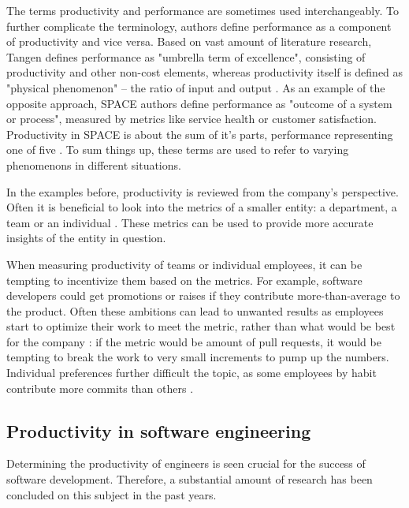 The terms productivity and performance are sometimes used interchangeably. To further complicate the terminology, authors define performance as a component of productivity and vice versa. Based on vast amount of literature research, Tangen defines performance as "umbrella term of excellence", consisting of productivity and other non-cost elements, whereas productivity itself is defined as "physical phenomenon" – the ratio of input and output \cite{tangen_demystifying_2005}. As an example of the opposite approach, SPACE authors define performance as "outcome of a system or process", measured by metrics like service health or customer satisfaction. Productivity in SPACE is about the sum of it's parts, performance representing one of five \cite{forsgren_space_2021}. To sum things up, these terms are used to refer to varying phenomenons in different situations.

In the examples before, productivity is reviewed from the company's perspective. Often it is beneficial to look into the metrics of a smaller entity: a department, a team or an individual \cite{forsgren_space_2021} \cite{tangen_demystifying_2005}. These metrics can be used to provide more accurate insights of the entity in question.

When measuring productivity of teams or individual employees, it can be tempting to incentivize them based on the metrics. For example, software developers could get promotions or raises if they contribute more-than-average to the product. Often these ambitions can lead to unwanted results as employees start to optimize their work to meet the metric, rather than what would be best for the company\cite{symons_software_2010} \cite{chew_no-nonsense_1988}: if the metric would be amount of pull requests, it would be tempting to break the work to very small increments to pump up the numbers. Individual preferences further difficult the topic, as some employees by habit contribute more commits than others \cite{oliveira_code_2020}. 

\subsection{Productivity in software engineering}

Determining the productivity of engineers is seen crucial for the success of software development. Therefore, a substantial amount of research has been concluded on this subject in the past years.\cite{oliveira_code_2020}

